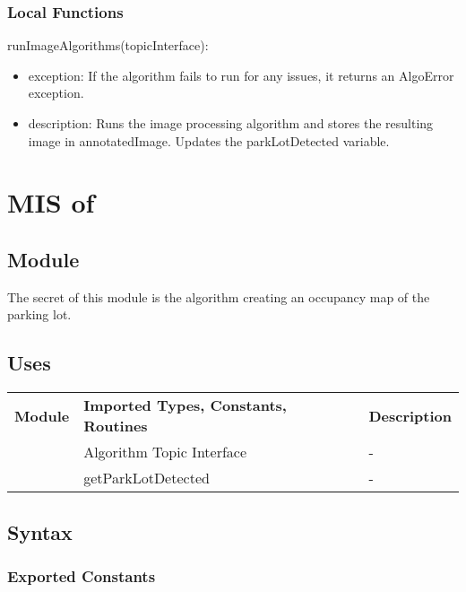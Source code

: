 \documentclass[12pt, titlepage]{article}
\begin{document}
\subsubsection{Local Functions}
\noindent runImageAlgorithms(topicInterface):
\begin{itemize}
\item exception: If the algorithm fails to run for any issues, it returns an AlgoError exception. 
\item description: Runs the image processing algorithm and stores the resulting image in annotatedImage. Updates the parkLotDetected variable.  
\end{itemize}
\newpage






\section{MIS of } \label{MIS_MAPPER_APP} 
\subsection{Module}
The secret of this module is the algorithm creating an occupancy map of the parking lot.
\subsection{Uses}
\begin{center}
\begin{tabular}{p{2 cm} p{5cm} p{6.5cm} } 
\hline
\textbf{Module} & \textbf{Imported Types, Constants, Routines} & \textbf{Description} \\
\nameref{Algorithm Topic Interface} & Algorithm Topic Interface & - \\
\nameref{Vision App} & getParkLotDetected  & - \\
\hline
\hline
\end{tabular}
\end{center}
\subsection{Syntax}
\subsubsection{Exported Constants}
\end{document}
